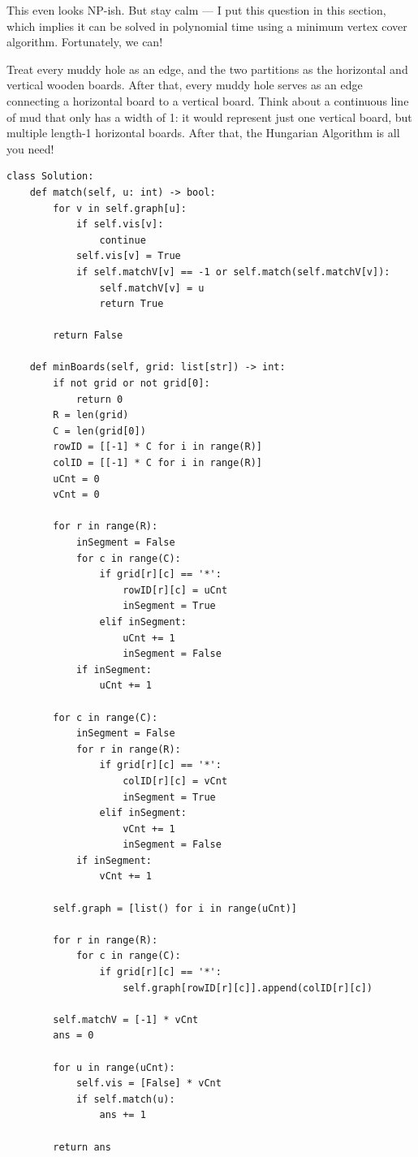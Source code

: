 \documentclass{article}
\begin{document}
This even looks NP-ish. But stay calm --- I put this question in this section, which implies it can be solved in polynomial time using a minimum vertex cover algorithm. Fortunately, we can!

Treat every muddy hole as an edge, and the two partitions as the horizontal and vertical wooden boards. After that, every muddy hole serves as an edge connecting a horizontal board to a vertical board. Think about a continuous line of mud that only has a width of 1: it would represent just one vertical board, but multiple length-1 horizontal boards. After that, the Hungarian Algorithm is all you need!

\begin{lstlisting}[style=python]
class Solution:
    def match(self, u: int) -> bool:
        for v in self.graph[u]:
            if self.vis[v]:
                continue
            self.vis[v] = True
            if self.matchV[v] == -1 or self.match(self.matchV[v]):
                self.matchV[v] = u
                return True
                
        return False

    def minBoards(self, grid: list[str]) -> int:
        if not grid or not grid[0]:
            return 0
        R = len(grid)
        C = len(grid[0])
        rowID = [[-1] * C for i in range(R)]
        colID = [[-1] * C for i in range(R)]
        uCnt = 0
        vCnt = 0
        
        for r in range(R):
            inSegment = False
            for c in range(C):
                if grid[r][c] == '*':
                    rowID[r][c] = uCnt
                    inSegment = True
                elif inSegment:
                    uCnt += 1
                    inSegment = False
            if inSegment: 
                uCnt += 1
                
        for c in range(C):
            inSegment = False
            for r in range(R):
                if grid[r][c] == '*':
                    colID[r][c] = vCnt
                    inSegment = True
                elif inSegment:
                    vCnt += 1
                    inSegment = False
            if inSegment: 
                vCnt += 1
                
        self.graph = [list() for i in range(uCnt)]
        
        for r in range(R):
            for c in range(C):
                if grid[r][c] == '*':
                    self.graph[rowID[r][c]].append(colID[r][c])
                    
        self.matchV = [-1] * vCnt
        ans = 0
        
        for u in range(uCnt):
            self.vis = [False] * vCnt
            if self.match(u):
                ans += 1
                
        return ans
\end{lstlisting}
\end{document}
